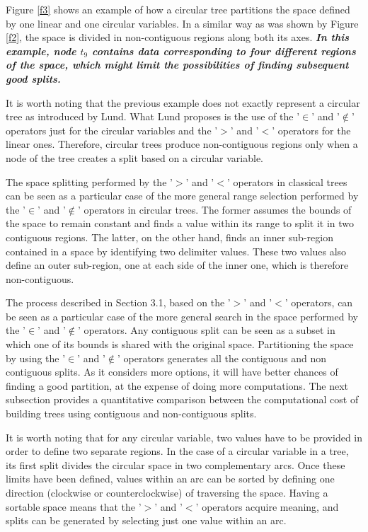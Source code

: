 \documentclass[times,twocolumn,final,authoryear]{elsarticle}
\begin{document}
Figure \ref{f3} shows an example of how a circular tree partitions the space defined by one linear and one circular variables. In a similar way as was shown by Figure \ref{f2}, the space is divided in non-contiguous regions along both its axes. \textbf{\textit{In this example, node $t_9$ contains data corresponding to four different regions of the space, which might limit the possibilities of finding subsequent good splits.}}  

It is worth noting that the previous example does not exactly represent a circular tree as introduced by Lund. What Lund proposes is the use of the '$\in$' and '$\notin$' operators just for the circular variables and the '$>$' and '$<$' operators for the linear ones. Therefore, circular trees produce non-contiguous regions only when a node of the tree creates a split based on a circular variable.

The space splitting performed by the '$>$' and '$<$' operators in classical trees can be seen as a particular case of the more general range selection performed by the '$\in$' and '$\notin$' operators in circular trees. The former assumes the bounds of the space to remain constant and finds a value within its range to split it in two contiguous regions. The latter, on the other hand, finds an inner sub-region contained in a space by identifying two delimiter values. These two values also define an outer sub-region, one at each side of the inner one, which is therefore non-contiguous.

The process described in Section 3.1, based on the '$>$' and '$<$' operators, can be seen as a particular case of the more general search in the space performed by the '$\in$' and '$\notin$' operators. Any contiguous split can be seen as a subset in which one of its bounds is shared with the original space. Partitioning the space by using the '$\in$' and '$\notin$' operators generates all the contiguous and non contiguous splits. As it considers more options, it will have better chances of finding a good partition, at the expense of doing more computations. The next subsection provides a quantitative comparison between the computational cost of building trees using contiguous and non-contiguous splits.

It is worth noting that for any circular variable, two values have to be provided in order to define two separate regions. In the case of a circular variable in a tree, its first split divides the circular space in two complementary arcs. Once these limits have been defined, values within an arc can be sorted by defining one direction (clockwise or counterclockwise) of traversing the space. Having a sortable space means that the '$>$' and '$<$' operators acquire meaning, and splits can be generated by selecting just one value within an arc.
\end{document}
